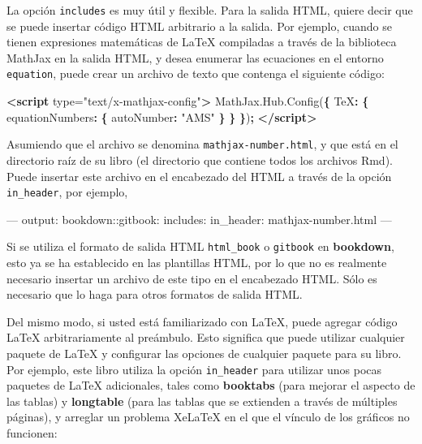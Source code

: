 \documentclass[12pt,]{krantz}
\makeatletter
\newenvironment{Shaded}{\begin{snugshade}}{\end{snugshade}}
\newcommand{\KeywordTok}[1]{\textcolor[rgb]{0.13,0.29,0.53}{\textbf{#1}}}
\newcommand{\DataTypeTok}[1]{\textcolor[rgb]{0.13,0.29,0.53}{#1}}
\newcommand{\StringTok}[1]{\textcolor[rgb]{0.31,0.60,0.02}{#1}}
\newcommand{\OtherTok}[1]{\textcolor[rgb]{0.56,0.35,0.01}{#1}}
\newcommand{\FunctionTok}[1]{\textcolor[rgb]{0.00,0.00,0.00}{#1}}
\newcommand{\VariableTok}[1]{\textcolor[rgb]{0.00,0.00,0.00}{#1}}
\newcommand{\OperatorTok}[1]{\textcolor[rgb]{0.81,0.36,0.00}{\textbf{#1}}}
\newcommand{\AttributeTok}[1]{\textcolor[rgb]{0.77,0.63,0.00}{#1}}
\newcommand{\NormalTok}[1]{#1}
\newenvironment{kframe}{%
\medskip{}
\setlength{\fboxsep}{.8em}
 \def\at@end@of@kframe{}%
 \ifinner\ifhmode%
  \def\at@end@of@kframe{\end{minipage}}%
  \begin{minipage}{\columnwidth}%
 \fi\fi%
 \def\FrameCommand##1{\hskip\@totalleftmargin \hskip-\fboxsep
 \colorbox{shadecolor}{##1}\hskip-\fboxsep
     \hskip-\linewidth \hskip-\@totalleftmargin \hskip\columnwidth}%
 \MakeFramed {\advance\hsize-\width
   \@totalleftmargin\z@ \linewidth\hsize
   \@setminipage}}%
 {\par\unskip\endMakeFramed%
 \at@end@of@kframe}
\renewenvironment{Shaded}{\begin{kframe}}{\end{kframe}}
\theoremstyle{definition}
\theoremstyle{definition}
\theoremstyle{definition}
\theoremstyle{remark}
\makeatother
\begin{document}
La opción \texttt{includes} es muy útil y flexible. Para la salida HTML,
quiere decir que se puede insertar código HTML arbitrario a la salida.
Por ejemplo, cuando se tienen expresiones matemáticas de LaTeX
compiladas a través de la biblioteca MathJax en la salida HTML, y desea
enumerar las ecuaciones en el entorno \texttt{equation}, puede crear un
archivo de texto que contenga el siguiente código:

\begin{Shaded}
\begin{Highlighting}[]
\KeywordTok{<script}\OtherTok{ type=}\StringTok{"text/x-mathjax-config"}\KeywordTok{>}
\VariableTok{MathJax}\NormalTok{.}\VariableTok{Hub}\NormalTok{.}\AttributeTok{Config}\NormalTok{(}\OperatorTok{\{}
  \DataTypeTok{TeX}\OperatorTok{:} \OperatorTok{\{} \DataTypeTok{equationNumbers}\OperatorTok{:} \OperatorTok{\{} \DataTypeTok{autoNumber}\OperatorTok{:} \StringTok{"AMS"} \OperatorTok{\}} \OperatorTok{\}}
\OperatorTok{\}}\NormalTok{)}\OperatorTok{;}
\KeywordTok{</script>}
\end{Highlighting}
\end{Shaded}

Asumiendo que el archivo se denomina \texttt{mathjax-number.html}, y que
está en el directorio raíz de su libro (el directorio que contiene todos
los archivos Rmd). Puede insertar este archivo en el encabezado del HTML
a través de la opción \texttt{in\_header}, por ejemplo,

\begin{Shaded}
\begin{Highlighting}[]
\OtherTok{---}
\FunctionTok{output:}
  \FunctionTok{bookdown:}\AttributeTok{:gitbook:}
    \FunctionTok{includes:}
      \FunctionTok{in_header:}\AttributeTok{ mathjax-number.html}
\OtherTok{---}
\end{Highlighting}
\end{Shaded}

Si se utiliza el formato de salida HTML \texttt{html\_book} o
\texttt{gitbook} en \textbf{bookdown}, esto ya se ha establecido en las
plantillas HTML, por lo que no es realmente necesario insertar un
archivo de este tipo en el encabezado HTML. Sólo es necesario que lo
haga para otros formatos de salida HTML.

Del mismo modo, si usted está familiarizado con LaTeX, puede agregar
código LaTeX arbitrariamente al preámbulo. Esto significa que puede
utilizar cualquier paquete de LaTeX y configurar las opciones de
cualquier paquete para su libro. Por ejemplo, este libro utiliza la
opción \texttt{in\_header} para utilizar unos pocas paquetes de LaTeX
adicionales, tales como \textbf{booktabs} (para mejorar el aspecto de
las tablas) y \textbf{longtable} (para las tablas que se extienden a
través de múltiples páginas), y arreglar un problema XeLaTeX en el que
el vínculo de los gráficos no funcionen:
\end{document}
